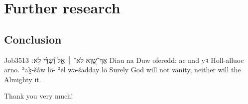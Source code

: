 \section{Further research}


\begin{paper}
	\section{Conclusion}


\begin{example}{Job}{35}{13}{}{}
	\quoling
	{אַךְ־שָׁ֭וְא לֹא־ ׀ אֵ֑ל וְ֝שַׁדַּ֗י לֹ֣א ׃}
	{Diau na  Duw oferedd: ac nad  yꝛ Holl-alluoc arno.}
	{ʾaḵ-šå̄w lō- ʾēl wə-šadday lō }
	{Surely God will not  vanity, neither will the Almighty  it.}
\end{example}

	Thank you very much!
\end{paper}
